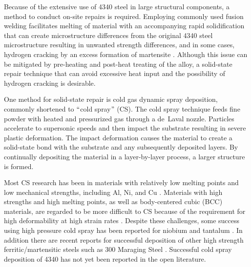 Because of the extensive use of 4340 steel in large structural components, a method to conduct on-site repairs is required. Employing commonly used fusion welding facilitates melting of material with an accompanying rapid solidification that can create microstructure differences from the original 4340 steel microstructure resulting in unwanted strength differences, and in some cases, hydrogen cracking by an excess formation of martensite \cite{RN771}. Although this issue can be mitigated by pre-heating and post-heat treating of the alloy, a solid-state repair technique that can avoid excessive heat input and the possibility of hydrogen cracking is desirable.



One method for solid-state repair is cold gas dynamic spray deposition, commonly shortened to $``$cold spray$"$  (CS). The cold spray technique feeds fine powder with heated and pressurized gas through a de Laval nozzle. Particles accelerate to supersonic speeds and then impact the substrate resulting in severe plastic deformation. The impact deformation causes the material to create a solid-state bond with the substrate and any subsequently deposited layers. By continually depositing the material in a layer-by-layer process, a larger structure is formed. 



Most CS research has been in materials with relatively low melting points and low mechanical strengths, including Al, Ni, and Cu \cite{RN706}. Materials with high strengths and high melting points, as well as body-centered cubic (BCC) materials, are regarded to be more difficult to CS because of the requirement for high deformability at high strain rates \cite{RN3375}. Despite these challenges, some success using high pressure cold spray has been reported for niobium and tantalum \cite{RN3445,RN1938}.  In addition there are recent reports for successful deposition of other high strength ferritic/martensitic steels such as 300 Maraging Steel \cite{RN3404}. Successful cold spray deposition of 4340 has not yet been reported in the open literature.



